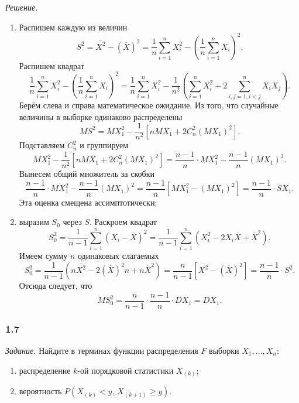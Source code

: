 \textit{Решение.}
\begin{enumerate}[label=\alph*)]
  \item Распишем каждую из величин
  $$S^2 =
    \overline{X^2} - \left( \overline{X} \right)^2 =
    \frac{1}{n} \sum \limits_{i = 1}^n X_i^2 -
    \left( \frac{1}{n} \sum \limits_{i = 1}^n X_i \right)^2.$$
  Распишем квадрат
  $$ \frac{1}{n} \sum \limits_{i = 1}^n X_i^2 -
    \left( \frac{1}{n} \sum \limits_{i = 1}^n X_i \right)^2 =
    \frac{1}{n} \sum \limits_{i = 1}^n X_i^2 -
    \frac{1}{n^2} \left(
      \sum \limits_{i = 1}^n X_i^2 + 2 \sum \limits_{i, j = 1, i < j}^n X_i X_j
    \right).$$
  Берём слева и справа математическое ожидание.
  Из того, что случайные величины в выборке одинаково распределены
  $$MS^2 =
    MX_1^2 - \frac{1}{n^2} \left[ nMX_1 + 2C_n^2 \left( MX_1 \right)^2 \right].$$
  Подставляем $C_n^2$ и группируем
  $$MX_1^2 - \frac{1}{n^2} \left[ nMX_1 + 2C_n^2 \left( MX_1 \right)^2 \right] =
    \frac{n - 1}{n} \cdot MX_1^2 - \frac{n - 1}{n} \left( MX_1 \right)^2.$$
  Вынесем общий множитель за скобки
  $$ \frac{n - 1}{n} \cdot MX_1^2 - \frac{n - 1}{n} \left( MX_1 \right)^2 =
    \frac{n - 1}{n} \left[ MX_1^2 - \left( MX_1 \right)^2 \right] =
    \frac{n - 1}{n} \cdot SX_1.$$
  Эта оценка смещена ассимптотически;
  \item выразим $S_0$ через $S$.
  Раскроем квадрат
  $$S_0^2 =
    \frac{1}{n - 1} \sum \limits_{i = 1}^n \left( X_i - \overline{X} \right)^2 =
    \frac{1}{n - 1}
    \sum \limits_{i = 1}^n \left( X_i^2 - 2X_i \overline{X} + \overline{X}^2 \right).$$
  Имеем сумму $n$ одинаковых слагаемых
  $$ S_0^2 =
    \frac{1}{n - 1}
    \left( n \overline{X^2} - 2 \left( \overline{X} \right)^2 n + n \overline{X}^2 \right) =
    \frac{n}{n - 1} \left[ \overline{X^2} - \left( \overline{X} \right)^2 \right] =
    \frac{n - 1}{n} \cdot S^2.$$
  Отсюда следует, что
  $$MS_0^2 =
    \frac{n}{n - 1} \cdot \frac{n - 1}{n} \cdot DX_1 =
    DX_1.$$
\end{enumerate}

\subsubsection*{1.7}

\textit{Задание.} Найдите в терминах функции распределения $F$ выборки $X_1, \dotsc, X_n$:
\begin{enumerate}[label=\alph*)]
  \item распределение $k$-ой порядковой статистики $X_{ \left( k \right) }$;
  \item вероятность
  $P \left( X_{ \left( k \right) } < y, \, X_{ \left( k + 1 \right) } \geq y \right) $.
\end{enumerate}

